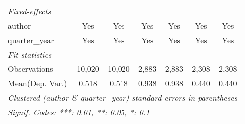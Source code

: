 \begin{tabular}{lcccccc}
   \midrule
   \emph{Fixed-effects}\\
   author                                & Yes           & Yes           & Yes           & Yes           & Yes           & Yes\\  
   quarter\_year                         & Yes           & Yes           & Yes           & Yes           & Yes           & Yes\\  
   \midrule
   \emph{Fit statistics}\\
   Observations                          & 10,020        & 10,020        & 2,883         & 2,883         & 2,308         & 2,308\\  
Mean(Dep. Var.) & 0.518 & 0.518 & 0.938 & 0.938 & 0.440 & 0.440 \\
   \midrule \midrule
   \multicolumn{7}{l}{\emph{Clustered (author \& quarter\_year) standard-errors in parentheses}}\\
   \multicolumn{7}{l}{\emph{Signif. Codes: ***: 0.01, **: 0.05, *: 0.1}}\\
\end{tabular}
\par\endgroup
